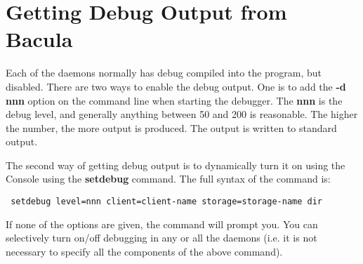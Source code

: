 \section{Getting Debug Output from Bacula}
Each of the daemons normally has debug compiled into the program, but
disabled. There are two ways to enable the debug output. One is to add the
{\bf -d nnn} option on the command line when starting the debugger. The {\bf
nnn} is the debug level, and generally anything between 50 and 200 is
reasonable. The higher the number, the more output is produced. The output is
written to standard output.

The second way of getting debug output is to dynamically turn it on using the
Console using the {\bf setdebug} command. The full syntax of the command is:

\footnotesize
\begin{verbatim}
 setdebug level=nnn client=client-name storage=storage-name dir
\end{verbatim}
\normalsize

If none of the options are given, the command will prompt you. You can
selectively turn on/off debugging in any or all the daemons (i.e. it is not
necessary to specify all the components of the above command).
